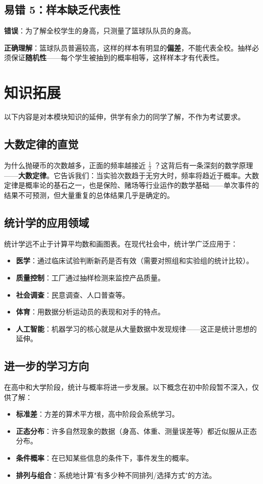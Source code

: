 \subsection*{易错 5：样本缺乏代表性}


\textbf{错误}：为了解全校学生的身高，只测量了篮球队队员的身高。

\textbf{正确理解}：篮球队员普遍较高，这样的样本有明显的\textbf{偏差}，不能代表全校。抽样必须保证\textbf{随机性}——每个学生被抽到的概率相等，这样样本才有代表性。



\section*{知识拓展}


以下内容是对本模块知识的延伸，供学有余力的同学了解，不作为考试要求。

\subsection*{大数定律的直觉}


为什么抛硬币的次数越多，正面的频率越接近 $\frac{1}{2}$ ？这背后有一条深刻的数学原理——\textbf{大数定律}。它告诉我们：当实验次数趋于无穷大时，频率将趋近于概率。大数定律是概率论的基石之一，也是保险、赌场等行业运作的数学基础——单次事件的结果不可预测，但大量重复的总体结果几乎是确定的。

\subsection*{统计学的应用领域}


统计学远不止于计算平均数和画图表。在现代社会中，统计学广泛应用于：

\begin{itemize}
  \item \textbf{医学}：通过临床试验判断新药是否有效（需要对照组和实验组的统计比较）。
  \item \textbf{质量控制}：工厂通过抽样检测来监控产品质量。
  \item \textbf{社会调查}：民意调查、人口普查等。
  \item \textbf{体育}：用数据分析运动员的表现和对手的特点。
  \item \textbf{人工智能}：机器学习的核心就是从大量数据中发现规律——这正是统计思想的延伸。
\end{itemize}


\subsection*{进一步的学习方向}


在高中和大学阶段，统计与概率将进一步发展。以下概念在初中阶段暂不深入，仅供了解：

\begin{itemize}
  \item \textbf{标准差}：方差的算术平方根，高中阶段会系统学习。
  \item \textbf{正态分布}：许多自然现象的数据（身高、体重、测量误差等）都近似服从正态分布。
  \item \textbf{条件概率}：在已知某些信息的条件下，事件发生的概率。
  \item \textbf{排列与组合}：系统地计算"有多少种不同排列/选择方式"的方法。
\end{itemize}

